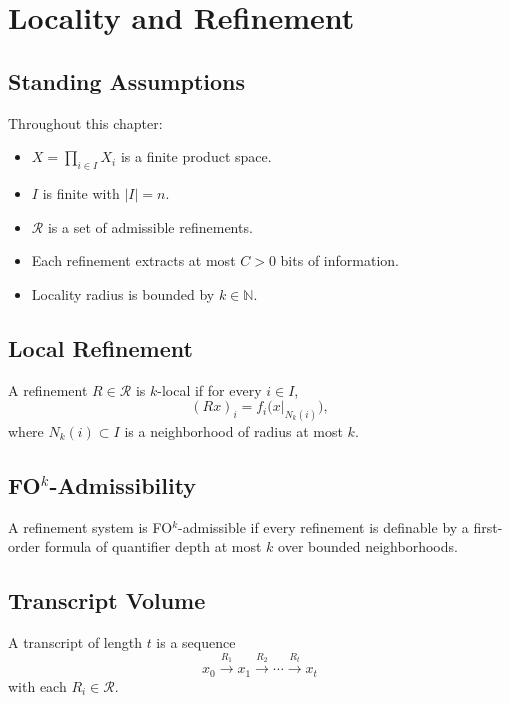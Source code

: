 \chapter{Locality and Refinement}

\section*{Standing Assumptions}

Throughout this chapter:

\begin{itemize}
\item $X = \prod_{i\in I} X_i$ is a finite product space.
\item $I$ is finite with $|I| = n$.
\item $\mathcal{R}$ is a set of admissible refinements.
\item Each refinement extracts at most $C>0$ bits of information.
\item Locality radius is bounded by $k \in \mathbb{N}$.
\end{itemize}

\section{Local Refinement}

\begin{definition}
A refinement $R \in \mathcal{R}$ is $k$-local if for every $i \in I$,
\[
(Rx)_i = f_i\bigl(x|_{N_k(i)}\bigr),
\]
where $N_k(i) \subset I$ is a neighborhood of radius at most $k$.
\end{definition}

\section{FO$^k$-Admissibility}

\begin{definition}
A refinement system is FO$^k$-admissible if every refinement is definable by a first-order formula of quantifier depth at most $k$ over bounded neighborhoods.
\end{definition}

\section{Transcript Volume}

\begin{definition}[Transcript]
A transcript of length $t$ is a sequence
\[
x_0 \xrightarrow{R_1} x_1 \xrightarrow{R_2} \cdots \xrightarrow{R_t} x_t
\]
with each $R_i \in \mathcal{R}$.
\end{definition}

